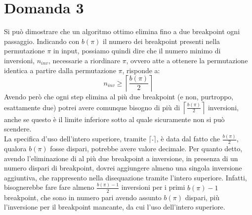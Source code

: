 \documentclass[a4paper,12pt, oneside]{book}
\begin{document}
\section{Domanda 3}
Si può dimostrare che un algoritmo ottimo elimina fino a due breakpoint ogni
passaggio. Indicando con $b(\pi)$ il numero dei breakpoint presenti
nella permutazione $\pi$ in input, possiamo quindi dire che il numero minimo di
inversioni, $n_{inv}$, necessarie a riordinare $\pi$, ovvero atte a ottenere la
permutazione identica a partire dalla permutazione $\pi$, risponde a:
\[n_{inv}\geq \left\lceil\frac{b(\pi)}{2}\right\rceil\]
Avendo però che ogni step elimina al più due breakpoint (e non, purtroppo,
esattamente due) potrei avere comunque bisogno di più di
$\left\lceil\frac{b(\pi)}{2}\right\rceil$ inversioni, anche se questo è il
limite inferiore sotto al quale sicuramente non si può scendere.\\
La specifica d'uso dell'intero superiore, tramite $\lceil\frac{\,}{\,}\rceil$,
è data dal 
fatto che $\frac{b(\pi)}{2}$, qualora $b(\pi)$ fosse dispari, potrebbe avere
valore decimale. Per quanto detto, avendo l'eliminazione di al più due
breakpoint a inversione, in presenza di un numero dispari di breakpoint, dovrei
aggiungere almeno una singola inversione aggiuntiva, che rappresento nella
disequazione tramite l'intero superiore. Infatti, bisognerebbe fare fare almeno
$\frac{b(\pi)-1}{2}$ inversioni per i primi $b(\pi)-1$ breakpoint, che sono in
numero pari avendo assunto $b(\pi)$ dispari, più l'inversione per il breakpoint
mancante, da cui l'uso dell'intero superiore.   
\end{document}
